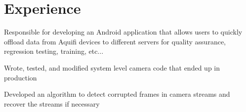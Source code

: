 \documentclass[letterpaper]{deedy-resume} %
\begin{document}
\begin{minipage}[t]{0.66\textwidth} %


\section{Experience}


\vspace{\topsep} %
\begin{tightitemize}
	\item 	Responsible for developing an Android application that allows users to quickly offload data from Aquifi devices to different servers for quality assurance, regression testing, training, etc...
	\item Wrote, tested, and modified system level camera code that ended up in production
	\item Developed an algorithm to detect corrupted frames in camera streams and recover the streams if necessary 
\end{tightitemize}

\sectionspace %




\end{minipage}
\end{document}
